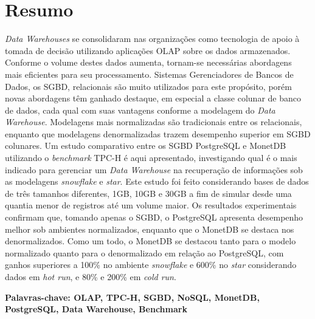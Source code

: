 
\chapter*{Resumo}

\noindent

\textit{Data Warehouses} se consolidaram nas organizações como tecnologia de apoio à tomada de decisão utilizando aplicações OLAP sobre os dados armazenados. Conforme o volume destes dados aumenta, tornam-se necessárias abordagens mais eficientes para seu processamento. Sistemas Gerenciadores de Bancos de Dados, os SGBD, relacionais são muito utilizados para este propósito, porém novas abordagens têm ganhado destaque, em especial a classe colunar de banco de dados, cada qual com suas vantagens conforme a modelagem do \textit{Data Warehouse}. Modelagens mais normalizadas são tradicionais entre os relacionais, enquanto que modelagens denormalizadas trazem desempenho superior em SGBD colunares. Um estudo comparativo entre os SGBD PostgreSQL e MonetDB utilizando o \textit{benchmark} TPC-H é aqui apresentado, investigando qual é o mais indicado para gerenciar um \textit{Data Warehouse} na recuperação de informações sob as modelagens \textit{snowflake} e \textit{star}. Este estudo foi feito considerando bases de dados de três tamanhos diferentes, 1GB, 10GB e 30GB a fim de simular desde uma quantia menor de registros até um volume maior. Os resultados experimentais confirmam que, tomando apenas o SGBD, o PostgreSQL apresenta desempenho melhor sob ambientes normalizados, enquanto que o MonetDB se destaca nos denormalizados. Como um todo, o MonetDB se destacou tanto para o modelo normalizado quanto para o denormalizado em relação ao PostgreSQL, com ganhos superiores a 100\% no ambiente \textit{snowflake} e 600\% no \textit{star} considerando dados em \textit{hot run}, e 80\% e 200\% em \textit{cold run}.


\vspace{1cm}
\noindent
\textbf{Palavras-chave: OLAP, TPC-H, SGBD, NoSQL, MonetDB, PostgreSQL, Data Warehouse, Benchmark}


